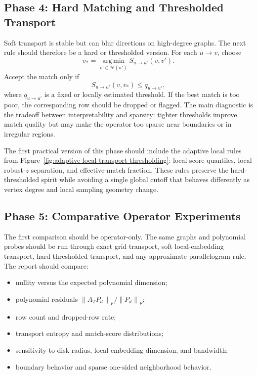 \documentclass[11pt]{article}
\newcommand{\N}{\mathcal N}
\newcommand{\norm}[1]{\left\lVert #1 \right\rVert}
\newcommand{\argmin}{\operatorname*{arg\,min}}
\begin{document}
\subsection{Phase 4: Hard Matching and Thresholded Transport}

Soft transport is stable but can blur directions on high-degree graphs.  The
next rule should therefore be a hard or thresholded version.  For each
\(u\to v\), choose
\[
  v_*=\argmin_{v'\in\N(u')}S_{u\to u'}(v,v').
\]
Accept the match only if
\[
  S_{u\to u'}(v,v_*)\le q_{u\to u'},
\]
where \(q_{u\to u'}\) is a fixed or locally estimated threshold.  If the best
match is too poor, the corresponding row should be dropped or flagged.  The
main diagnostic is the tradeoff between interpretability and sparsity: tighter
thresholds improve match quality but may make the operator too sparse near
boundaries or in irregular regions.

The first practical version of this phase should include the adaptive local
rules from Figure~\ref{fig:adaptive-local-transport-thresholding}: local score
quantiles, local robust-\(z\) separation, and effective-match fraction.  These
rules preserve the hard-thresholded spirit while avoiding a single global
cutoff that behaves differently as vertex degree and local sampling geometry
change.

\subsection{Phase 5: Comparative Operator Experiments}

The first comparison should be operator-only.  The same graphs and polynomial
probes should be run through exact grid transport, soft local-embedding
transport, hard thresholded transport, and any approximate parallelogram rule.
The report should compare:

\begin{itemize}[leftmargin=*]
  \item nullity versus the expected polynomial dimension;
  \item polynomial residuals \(\norm{A_TP_d}_F/\norm{P_d}_F\);
  \item row count and dropped-row rate;
  \item transport entropy and match-score distributions;
  \item sensitivity to disk radius, local embedding dimension, and bandwidth;
  \item boundary behavior and sparse one-sided neighborhood behavior.
\end{itemize}
\end{document}
